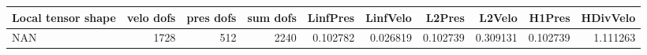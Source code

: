 \begin{tabular}{lrrrrrrrrr}
\toprule
Local tensor shape &  velo dofs &  pres dofs &  sum dofs &  LinfPres &  LinfVelo &   L2Pres &   L2Velo &   H1Pres &  HDivVelo \\
\midrule
               NAN &       1728 &        512 &      2240 &  0.102782 &  0.026819 & 0.102739 & 0.309131 & 0.102739 &  1.111263 \\
\bottomrule
\end{tabular}

